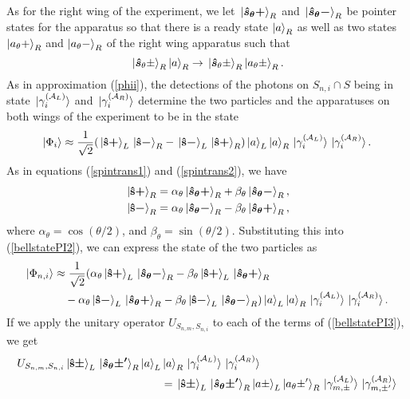 As for the right wing of the experiment, we let  $\ket*{\bm{\hat{s}_\theta+}}_R$ and $\ket*{\bm{\hat{s}_\theta-}}_R$ be pointer states for the apparatus so that there is a ready state $\ket{a}_R$  as well as two states $\ket{a_\theta+}_R$ and $\ket{a_\theta-}_R$ of the right wing apparatus such that 
$$\ket*{\bm{\hat{s}}_\theta\pm}_R\ket{a}_R\rightarrow\ket*{\bm{\hat{s}}_\theta\pm}_R\ket{a_\theta\pm}_R.$$
As in approximation (\ref{phii}), the detections of the photons on $S_{n,i}\cap S$ being in state $\ket*{\gamma_i^{(\mathcal{A}_L)}}$ and $\ket*{\gamma_i^{(\mathcal{A}_R)}}$ determine the two particles and the apparatuses on both wings of the experiment to be in the state 
\begin{equation}\label{bellstatePI2}
	\ket{\Phi_i}\approx \frac{1}{\sqrt{2}}(\ket*{\vb{\hat{{s}}}\bm{+}}_L\ket*{\vb{\hat{{s}}}\bm{-}}_R-\ket*{\vb{\hat{{s}}}\bm{-}}_L\ket*{\vb{\hat{{s}}}\bm{+}}_R)\ket{a}_L\ket{a}_R\ket*{\gamma_i^{(\mathcal{A}_L)}}\ket*{\gamma_i^{(\mathcal{A}_R)}}.
\end{equation}
As in equations (\ref{spintrans1}) and (\ref{spintrans2}), we have
\begin{align*}
\ket*{\vb{\hat{{s}}}\bm{+}}_R&= \alpha_\theta\ket*{\bm{\hat{s}_\theta+}}_R+\beta_\theta \ket*{\bm{\hat{s}_\theta-}}_R,\\
\ket*{\vb{\hat{{s}}}\bm{-}}_R&= \alpha_\theta\ket*{\bm{\hat{s}_\theta-}}_R-\beta_\theta \ket*{\bm{\hat{s}_\theta+}}_R,
\end{align*}
where $\alpha_\theta=\cos(\theta/2)$, and $\beta_\theta=\sin(\theta/2).$
Substituting this into (\ref{bellstatePI2}), we can express the state of the two particles as
\begin{equation}\label{bellstatePI3}
	\begin{split}
	\ket{\Phi_{n,i}}&\approx\frac{1}{\sqrt{2}}(\alpha_\theta\ket*{\vb{\hat{{s}}}\bm{+}}_L\ket*{\bm{\hat{s}_\theta-}}_R
	-\beta_\theta\ket*{\vb{\hat{{s}}}\bm{+}}_L\ket*{\bm{\hat{s}_\theta+}}_R\\
	&\quad-\alpha_\theta\ket*{\vb{\hat{{s}}}\bm{-}}_L\ket*{\bm{\hat{s}_\theta+}}_R
	-\beta_\theta\ket*{\vb{\hat{{s}}}\bm{-}}_L\ket*{\bm{\hat{s}_\theta-}}_R)\ket{a}_L\ket{a}_R\ket*{\gamma_i^{(\mathcal{A}_L)}}\ket*{\gamma_i^{(\mathcal{A}_R)}}.
	\end{split}
\end{equation}
If we apply the unitary operator $U_{S_{n,m},S_{n,i}}$ to each of the terms of (\ref{bellstatePI3}), we get 
\begin{equation}
	\begin{split}
U_{S_{n,m},S_{n,i}}\ket*{\vb{\hat{{s}}}\bm{\pm}}_L\ket*{\bm{\hat{s}_\theta\pm'}}_R\ket{a}_L&\ket{a}_R\ket*{\gamma_i^{(\mathcal{A}_L)}}\ket*{\gamma_i^{(\mathcal{A}_R)}}\\
&=\ket*{\vb{\hat{{s}}}\bm{\pm}}_L\ket*{\bm{\hat{s}_\theta\pm'}}_R\ket{a\pm}_L\ket{a_\theta\pm'}_R\ket*{\gamma_{m,\pm}^{(\mathcal{A}_L)}}\ket*{\gamma_{m,\pm'}^{(\mathcal{A}_R)}}
	\end{split}
\end{equation}
